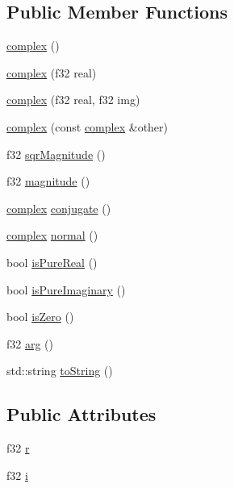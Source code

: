 \subsection*{Public Member Functions}
\begin{DoxyCompactItemize}
\item 
\hyperlink{classqlib_1_1math_1_1complex_ab644fd7573e2bdbbfc02cf95b3fcdf62}{complex} ()
\item 
\hyperlink{classqlib_1_1math_1_1complex_a0eeea99f7c7d4a8e072f6c4836379ed0}{complex} (f32 real)
\item 
\hyperlink{classqlib_1_1math_1_1complex_a0dd3216eb1b24c906b394e67c59adda1}{complex} (f32 real, f32 img)
\item 
\hyperlink{classqlib_1_1math_1_1complex_ab1471e90345a25e6d112216f1a634290}{complex} (const \hyperlink{classqlib_1_1math_1_1complex}{complex} \&other)
\item 
f32 \hyperlink{classqlib_1_1math_1_1complex_ad1a8ab1ad95a47206e72d3a0d7be9511}{sqr\+Magnitude} ()
\item 
f32 \hyperlink{classqlib_1_1math_1_1complex_a8b365d2760802f1318e02c78c8938d2f}{magnitude} ()
\item 
\hyperlink{classqlib_1_1math_1_1complex}{complex} \hyperlink{classqlib_1_1math_1_1complex_a2cfd8546410a48d0568996e40beb85ce}{conjugate} ()
\item 
\hyperlink{classqlib_1_1math_1_1complex}{complex} \hyperlink{classqlib_1_1math_1_1complex_a088dcd1f0349632d0930177e95aa4729}{normal} ()
\item 
bool \hyperlink{classqlib_1_1math_1_1complex_a7a670edef0db4264e211e68aea71f0ec}{is\+Pure\+Real} ()
\item 
bool \hyperlink{classqlib_1_1math_1_1complex_a4465bc164fe2b490c917fc9321530ebb}{is\+Pure\+Imaginary} ()
\item 
bool \hyperlink{classqlib_1_1math_1_1complex_ae8f4008d499a05bbebecd48e0bf504d7}{is\+Zero} ()
\item 
f32 \hyperlink{classqlib_1_1math_1_1complex_a760122d26f377b008e129ff92b134a43}{arg} ()
\item 
std\+::string \hyperlink{classqlib_1_1math_1_1complex_afd24fadb21a07815675481b131398cff}{to\+String} ()
\end{DoxyCompactItemize}
\subsection*{Public Attributes}
\begin{DoxyCompactItemize}
\item 
f32 \hyperlink{classqlib_1_1math_1_1complex_aceb455ba091019bbd625fdaf529a0107}{r}
\item 
f32 \hyperlink{classqlib_1_1math_1_1complex_a4d599b5885fd37c300cdb79433356bb5}{i}
\end{DoxyCompactItemize}


